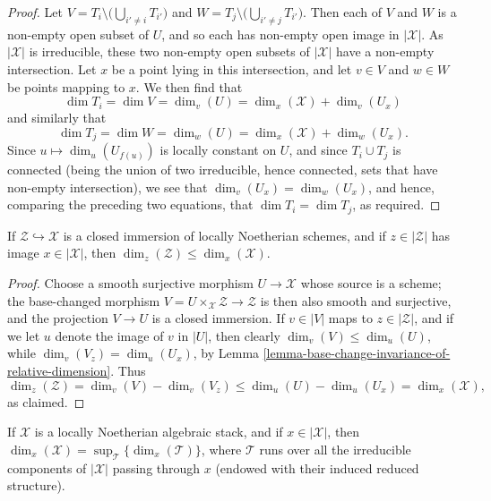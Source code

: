 \begin{proof}
\medskip\noindent
Let $V = T_i \setminus \bigl( \bigcup_{i' \neq i} T_{i'}\bigr)$
and $W = T_j \setminus \bigl( \bigcup_{i' \neq j} T_{i'}\bigr)$.
Then each of $V$ and $W$ is a non-empty open subset of $U$,
and so each has non-empty open image in $|\mathcal{X}|$.  As $|\mathcal{X}|$ is
irreducible,
these two non-empty open subsets of $|\mathcal{X}|$ have a non-empty
intersection.
Let $x$ be a point lying in this intersection, and let $v \in V$ and
$w\in W$ be points mapping to $x$.
We then find that
$$
\dim T_i = \dim V = \dim_v (U) = \dim_x (\mathcal{X}) + \dim_v (U_x)
$$
and similarly that
$$
\dim T_j = \dim W = \dim_w (U) = \dim_x (\mathcal{X}) + \dim_w (U_x).
$$
Since $u \mapsto \dim_u (U_{f(u)})$ is locally constant on $U$,
and since $T_i \cup T_j$ is connected (being the union of two irreducible,
hence connected, sets that have non-empty intersection),
we see that $\dim_v (U_x) = \dim_w(U_x)$,
and hence, comparing the preceding two equations,
that $\dim T_i = \dim T_j$, as required.
\end{proof}

\begin{lemma}
\label{lemma-closed-immersions}
If $\mathcal{Z} \hookrightarrow \mathcal{X}$ is a closed immersion
of locally Noetherian schemes,
and if $z \in |\mathcal{Z}|$ has image $x \in |\mathcal{X}|$,
then $\dim_z (\mathcal{Z}) \leq \dim_x(\mathcal{X})$.
\end{lemma}

\begin{proof}
Choose a smooth surjective morphism
$U\to \mathcal{X}$ whose source is a scheme;
the base-changed morphism
$V = U\times_{\mathcal{X}} \mathcal{Z} \to \mathcal{Z}$
is then also smooth and surjective, and the projection
$V \to U$ is a closed immersion.
If $v \in |V|$ maps to $z \in |\mathcal{Z}|$, and
if we let $u$ denote the image of $v$ in $|U|$,
then clearly
$\dim_v(V) \leq \dim_u(U)$,
while
$\dim_v (V_z) = \dim_u(U_x)$,
by Lemma \ref{lemma-base-change-invariance-of-relative-dimension}.
Thus
$$
\dim_z(\mathcal{Z})  = \dim_v(V) - \dim_v(V_z)
\leq \dim_u(U) - \dim_u(U_x) = \dim_x(\mathcal{X}),
$$
as claimed.
\end{proof}

\begin{lemma}
\label{lemma-dimension-via-components}
If $\mathcal{X}$ is a locally Noetherian algebraic stack, and if
$x \in |\mathcal{X}|$,
then $\dim_x(\mathcal{X}) = \sup_{\mathcal{T}} \{ \dim_x(\mathcal{T}) \} $,
where $\mathcal{T}$ runs over all the irreducible components
of $|\mathcal{X}|$ passing through $x$ (endowed with their
induced reduced structure).
\end{lemma}

